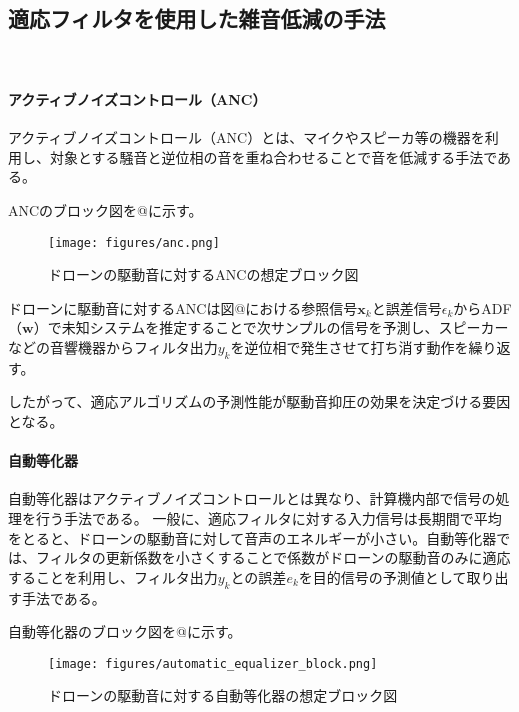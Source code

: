 \
\subsection{適応フィルタを使用した雑音低減の手法}\label{adf-noise-reduction}

\
\paragraph{アクティブノイズコントロール（ANC）}\label{anc}

アクティブノイズコントロール（ANC）とは、マイクやスピーカ等の機器を利用し、対象とする騒音と逆位相の音を重ね合わせることで音を低減する手法である。

ANCのブロック図を@に示す。

\begin{figure}
\centering
\texttt{[image: figures/anc.png]}
\caption{ドローンの駆動音に対するANCの想定ブロック図}
\label{anc_block}
\end{figure}

ドローンに駆動音に対するANCは図@における参照信号\(\bm{x}_k\)と誤差信号\(\epsilon_k\)からADF（\(\bm{w}\)）で未知システムを推定することで次サンプルの信号を予測し、スピーカーなどの音響機器からフィルタ出力\(y_k\)を逆位相で発生させて打ち消す動作を繰り返す。

したがって、適応アルゴリズムの予測性能が駆動音抑圧の効果を決定づける要因となる。

\paragraph{自動等化器}\label{automatic-equalizer}

自動等化器はアクティブノイズコントロールとは異なり、計算機内部で信号の処理を行う手法である。
一般に、適応フィルタに対する入力信号は長期間で平均をとると、ドローンの駆動音に対して音声のエネルギーが小さい。自動等化器では、フィルタの更新係数を小さくすることで係数がドローンの駆動音のみに適応することを利用し、フィルタ出力\(y_k\)との誤差\(e_k\)を目的信号の予測値として取り出す手法である。

自動等化器のブロック図を@に示す。

\begin{figure}
\centering
\texttt{[image: figures/automatic\_equalizer\_block.png]}
\caption{ドローンの駆動音に対する自動等化器の想定ブロック図}
\end{figure}

